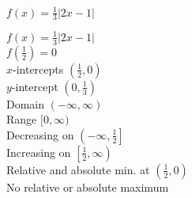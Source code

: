 {$f(x) =\frac{1}{3}|2x - 1|$}
{$f(x) = \frac{1}{3}|2x - 1|$ \\ $f\left(\frac{1}{2}\right) = 0$ \\ $x$-intercepts $\left(\frac{1}{2}, 0\right)$ \\ $y$-intercept $\left(0, \frac{1}{3}\right)$ \\ Domain $(-\infty, \infty)$ \\ Range $[0, \infty)$ \\ Decreasing on $\left(-\infty, \frac{1}{2}\right]$ \\ Increasing on $\left[\frac{1}{2}, \infty\right)$ \\ Relative and absolute min. at $\left(\frac{1}{2},0\right)$ \\ No relative or absolute maximum 

\begin{center}
\end{center}}